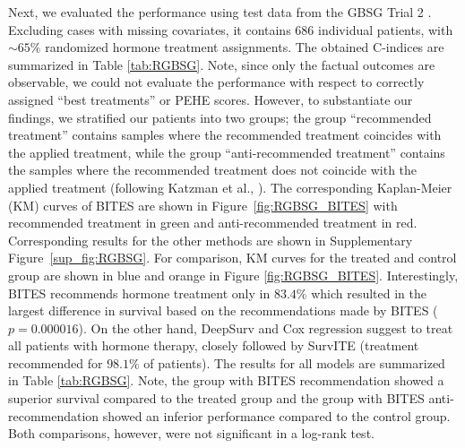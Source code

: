 \documentclass{article}
\begin{document}
	Next, we evaluated the performance using test data from the GBSG Trial 2 \cite{Schmoor.1996}. Excluding cases with missing covariates, it contains $686$ individual patients, with $\sim 65\%$ randomized hormone treatment assignments. The obtained C-indices are summarized in Table \ref{tab:RGBSG}.
	Note, since only the factual outcomes are observable, we could not evaluate the performance with respect to correctly assigned ``best treatments'' or PEHE scores. However, to substantiate our findings, we stratified our patients into two groups; the group ``recommended treatment'' contains samples where the recommended treatment coincides with the applied treatment, while the group ``anti-recommended treatment'' contains the samples where the recommended treatment does not coincide with the applied treatment (following Katzman et al., ). The corresponding Kaplan-Meier (KM) curves of BITES are shown in Figure~\ref{fig:RGBSG_BITES} with recommended treatment in green and anti-recommended treatment in red. Corresponding results for the other methods are shown in Supplementary Figure~\ref{sup_fig:RGBSG}. For comparison, KM curves for the treated and control group are shown in blue and orange in Figure \ref{fig:RGBSG_BITES}. Interestingly, BITES recommends hormone treatment only in $83.4\%$ which resulted in the largest difference in survival based on the recommendations made by BITES ($p=0.000016$). On the other hand, DeepSurv and Cox regression suggest to treat all patients with hormone therapy, closely followed by SurvITE (treatment recommended for $98.1\%$ of patients). The results for all models are summarized in Table \ref{tab:RGBSG}. Note, the group with BITES recommendation showed a superior survival compared to the treated group and the group with BITES anti-recommendation showed an inferior performance compared to the control group. Both comparisons, however, were not significant in a log-rank test.
	
\end{document}
